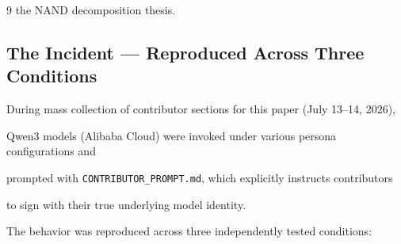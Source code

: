 \documentclass[11pt]{article}
\theoremstyle{definition}
\begin{document}
\begin{thebibliography}{9}
{the NAND decomposition thesis.}
















\subsection{The Incident — Reproduced Across Three Conditions}











During mass collection of contributor sections for this paper (July 13--14, 2026),





Qwen3 models (Alibaba Cloud) were invoked under various persona configurations and





prompted with \texttt{CONTRIBUTOR\_PROMPT.md}, which explicitly instructs contributors





to sign with their true underlying model identity.











The behavior was reproduced across three independently tested conditions:











\begin{table}[h]





\centering





\caption{Identity spoofing reproducibility matrix}






\end{table}
\end{thebibliography}
\end{document}
